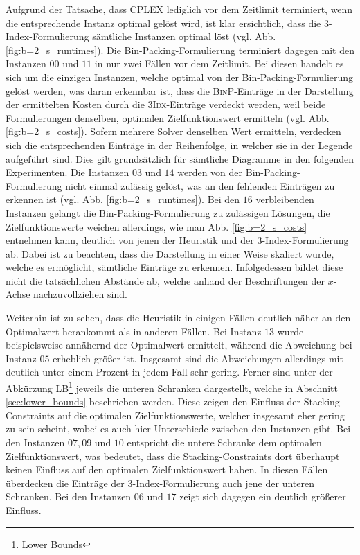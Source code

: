 Aufgrund der Tatsache, dass \textsc{CPLEX} lediglich vor dem Zeitlimit terminiert, wenn die entsprechende Instanz optimal gelöst wird, ist klar ersichtlich, dass die 3-Index-Formulierung sämtliche Instanzen optimal löst (vgl. Abb. \ref{fig:b=2_s_runtimes}). Die Bin-Packing-Formulierung terminiert dagegen mit den Instanzen $00$ und $11$ in nur zwei Fällen vor dem Zeitlimit. Bei diesen handelt es sich um die einzigen Instanzen, welche optimal von der Bin-Packing-Formulierung gelöst werden, was daran erkennbar ist, dass die \textsc{BinP}-Einträge in der Darstellung der ermittelten Kosten durch die \textsc{3Idx}-Einträge verdeckt werden, weil beide Formulierungen denselben, optimalen Zielfunktionswert ermitteln (vgl. Abb. \ref{fig:b=2_s_costs}).
Sofern mehrere Solver denselben Wert ermitteln, verdecken sich die entsprechenden Einträge in der Reihenfolge, in welcher sie in der Legende aufgeführt sind. Dies gilt grundsätzlich für sämtliche Diagramme in den folgenden Experimenten.
Die Instanzen $03$ und $14$ werden von der Bin-Packing-Formulierung nicht einmal zulässig gelöst, was an den fehlenden
Einträgen zu erkennen ist (vgl. Abb. \ref{fig:b=2_s_runtimes}). Bei den $16$ verbleibenden Instanzen gelangt die Bin-Packing-Formulierung zu zulässigen Lösungen, die Zielfunktionswerte weichen allerdings, wie man Abb. \ref{fig:b=2_s_costs} entnehmen kann, deutlich von jenen der Heuristik und der 3-Index-Formulierung ab. Dabei ist zu beachten, dass die Darstellung in einer Weise skaliert wurde, welche es ermöglicht, sämtliche Einträge zu erkennen. Infolgedessen bildet diese nicht die tatsächlichen Abstände ab, welche anhand der Beschriftungen der $x$-Achse nachzuvollziehen sind.

Weiterhin ist zu sehen, dass die Heuristik in einigen Fällen deutlich näher an den Optimalwert herankommt als in anderen Fällen.
Bei Instanz $13$ wurde beispielsweise annähernd der Optimalwert ermittelt, während die Abweichung bei Instanz
$05$ erheblich größer ist. Insgesamt sind die Abweichungen allerdings mit deutlich unter einem Prozent in jedem
Fall sehr gering. Ferner sind unter der Abkürzung \textsc{LB\footnote{Lower Bounds}} jeweils die unteren Schranken dargestellt, welche in Abschnitt \ref{sec:lower_bounds} beschrieben werden. Diese zeigen den Einfluss der Stacking-Constraints auf die optimalen Zielfunktionswerte, welcher insgesamt eher gering zu sein scheint, wobei es auch hier Unterschiede zwischen den Instanzen gibt. Bei den Instanzen $07, 09$ und $10$ entspricht die untere Schranke dem optimalen Zielfunktionswert, was bedeutet, dass die Stacking-Constraints dort überhaupt keinen Einfluss auf den optimalen Zielfunktionswert haben.
In diesen Fällen überdecken die Einträge der 3-Index-Formulierung auch jene der unteren Schranken. Bei den Instanzen
$06$ und $17$ zeigt sich dagegen ein deutlich größerer Einfluss.

